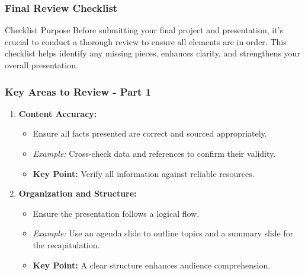 \documentclass[aspectratio=169]{beamer}
\begin{document}
\begin{frame}[fragile]
    \frametitle{Final Review Checklist}
    \begin{block}{Checklist Purpose}
        Before submitting your final project and presentation, it's crucial to conduct a thorough review to ensure all elements are in order. This checklist helps identify any missing pieces, enhances clarity, and strengthens your overall presentation.
    \end{block}
\end{frame}

\begin{frame}[fragile]
    \frametitle{Key Areas to Review - Part 1}
    \begin{enumerate}
        \item \textbf{Content Accuracy:}
        \begin{itemize}
            \item Ensure all facts presented are correct and sourced appropriately.
            \item \textit{Example:} Cross-check data and references to confirm their validity.
            \item \textbf{Key Point:} Verify all information against reliable resources.
        \end{itemize}

        \item \textbf{Organization and Structure:}
        \begin{itemize}
            \item Ensure the presentation follows a logical flow.
            \item \textit{Example:} Use an agenda slide to outline topics and a summary slide for the recapitulation.
            \item \textbf{Key Point:} A clear structure enhances audience comprehension.
        \end{itemize}
    \end{enumerate}
\end{frame}
\end{document}
